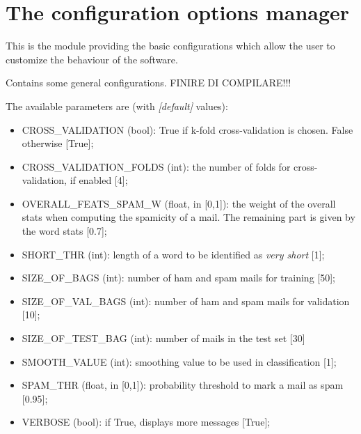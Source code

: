 \documentclass[letterpaper,10pt,english]{sphinxmanual}
\begin{document}
\section{The configuration options manager}
\label{index:the-configuration-options-manager}
This is the module providing the basic configurations which allow the user to customize the behaviour of the software.
\label{index:module-config}

\begin{fulllineitems}
\label{index:config.Config}
Contains some general configurations. FINIRE DI COMPILARE!!!

The available parameters are (with \emph{{[}default{]}} values):
\begin{itemize}
\item {} 
CROSS\_VALIDATION (bool): True if k-fold cross-validation is chosen.        False otherwise {[}True{]};

\item {} 
CROSS\_VALIDATION\_FOLDS (int): the number of folds for        cross-validation, if enabled {[}4{]};

\item {} 
OVERALL\_FEATS\_SPAM\_W (float, in {[}0,1{]}): the weight of the overall stats        when computing the spamicity of a mail. The remaining part is given by        the word stats {[}0.7{]};

\item {} 
SHORT\_THR (int): length of a word to be identified as \emph{very short} {[}1{]};

\item {} 
SIZE\_OF\_BAGS (int): number of ham and spam mails for training {[}50{]};

\item {} 
SIZE\_OF\_VAL\_BAGS (int): number of ham and spam mails for validation {[}10{]};

\item {} 
SIZE\_OF\_TEST\_BAG (int): number of mails in the test set {[}30{]}

\item {} 
SMOOTH\_VALUE (int): smoothing value to be used in classification {[}1{]};

\item {} 
SPAM\_THR (float, in {[}0,1{]}): probability threshold to mark a mail as spam {[}0.95{]};

\item {} 
VERBOSE (bool): if True, displays more messages {[}True{]};


\end{itemize}
\end{fulllineitems}
\end{document}

